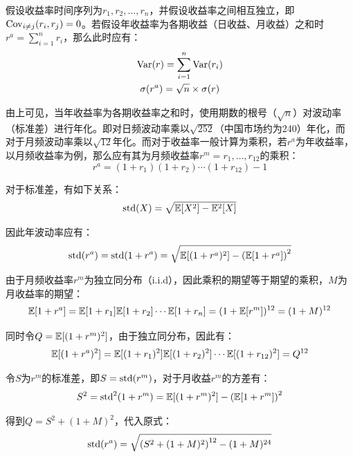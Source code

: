 \documentclass[11pt]{article}
\begin{document}
假设收益率时间序列为$r_1, r_2, \dots, r_n$，并假设收益率之间相互独立，即$\operatorname{Cov}_{i\neq j} (r_i, r_j) = 0$。若假设年收益率为各期收益（日收益、月收益）之和时$r^a = \sum_{i=1}^{n} r_i$，那么此时应有：
\begin{gather*}
    \operatorname{Var}(r) = \sum_{i=1}^{n} \operatorname{Var}(r_i) \\
    \sigma(r^a) = \sqrt{n} \times \sigma(r)
\end{gather*}

由上可见，当年收益率为各期收益率之和时，使用期数的根号（$\sqrt{n}$）对波动率（标准差）进行年化。即对日频波动率乘以$\sqrt{252}$（中国市场约为240）年化，而对于月频波动率乘以$\sqrt{12}$年化。而对于收益率一般计算为乘积，若$r^a$为年收益率，以月频收益率为例，那么应有其为月频收益率$r^m = r_1,\dots,r_{12}$的乘积：
\begin{equation*}
    r^a = (1+r_1)(1+r_2)\cdots(1+r_{12})-1
\end{equation*}

对于标准差，有如下关系：
\begin{equation*}
    \text{std}(X) = \sqrt{\mathbb{E}[X^2] - \mathbb{E}^2[X]}
\end{equation*}

因此年波动率应有：
\begin{equation*}
    \text{std}(r^a) = \text{std}(1+r^a) = \sqrt{\mathbb{E}[(1+r^a)^2] - \left(\mathbb{E}[1+r^a]\right)^2}
\end{equation*}

由于月频收益率$r^m$为独立同分布（i.i.d），因此乘积的期望等于期望的乘积，$M$为月收益率的期望：
\begin{equation*}
    \mathbb{E}[1+r^a] = \mathbb{E}[1+r_1] \mathbb{E}[1+r_2] \cdots \mathbb{E}[1+r_n] = (1+\mathbb{E}[r^m])^{12} = (1+M)^{12}
\end{equation*}

同时令$Q = \mathbb{E}[(1+r^m)^2]$，由于独立同分布，因此有：
\begin{equation*}
    \mathbb{E}[(1+r^a)^2] = \mathbb{E}[(1+r_1)^2] \mathbb{E}[(1+r_2)^2] \cdots \mathbb{E}[(1+r_{12})^2] = Q^{12}
\end{equation*}

令$S$为$r^m$的标准差，即$S=\text{std}(r^m)$，对于月收益$r^m$的方差有：
\begin{equation*}
    S^2 = \text{std}^2(1+r^m) = \mathbb{E}[(1+r^m)^2] - \left(\mathbb{E}[1+r^m]\right)^2
\end{equation*}

得到$Q= S^2 + (1+M)^2$，代入原式：
\begin{equation*}
    \text{std}(r^a) = \sqrt{ \left(S^2 + (1+M)^2\right)^{12} - (1+M)^{24}}
\end{equation*}
\end{document}
